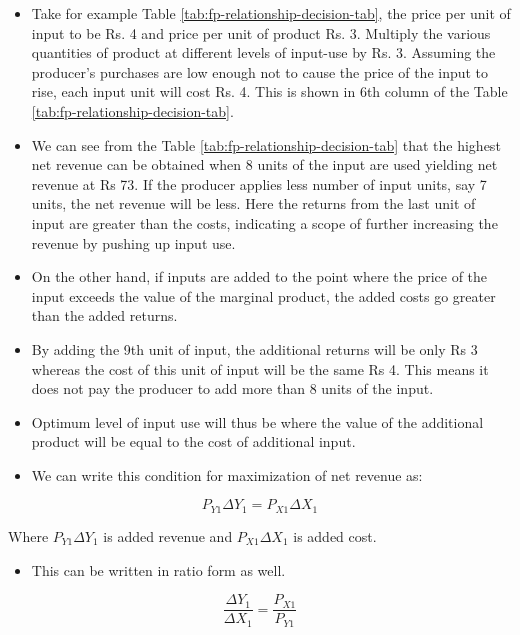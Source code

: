 \documentclass[12pt,ignorenonframetext,aspectratio=169]{beamer}
\providecommand{\tightlist}{%
  \setlength{\itemsep}{0pt}\setlength{\parskip}{0pt}}
\begin{document}
\begin{frame}{}
\protect\hypertarget{section-15}{}
\begin{itemize}
\tightlist
\item
  Take for example Table \ref{tab:fp-relationship-decision-tab}, the
  price per unit of input to be Rs. 4 and price per unit of product Rs.
  3. Multiply the various quantities of product at different levels of
  input-use by Rs. 3. Assuming the producer's purchases are low enough
  not to cause the price of the input to rise, each input unit will cost
  Rs. 4. This is shown in 6th column of the Table
  \ref{tab:fp-relationship-decision-tab}.
\item
  We can see from the Table \ref{tab:fp-relationship-decision-tab} that
  the highest net revenue can be obtained when 8 units of the input are
  used yielding net revenue at Rs 73. If the producer applies less
  number of input units, say 7 units, the net revenue will be less. Here
  the returns from the last unit of input are greater than the costs,
  indicating a scope of further increasing the revenue by pushing up
  input use.
\end{itemize}
\end{frame}

\begin{frame}{}
\protect\hypertarget{section-16}{}
\begin{itemize}
\tightlist
\item
  On the other hand, if inputs are added to the point where the price of
  the input exceeds the value of the marginal product, the added costs
  go greater than the added returns.
\item
  By adding the 9th unit of input, the additional returns will be only
  Rs 3 whereas the cost of this unit of input will be the same Rs 4.
  This means it does not pay the producer to add more than 8 units of
  the input.
\item
  Optimum level of input use will thus be where the value of the
  additional product will be equal to the cost of additional input.
\end{itemize}
\end{frame}

\begin{frame}{}
\protect\hypertarget{section-17}{}
\begin{itemize}
\tightlist
\item
  We can write this condition for maximization of net revenue as:
\end{itemize}

\[
P_{Y1} \Delta Y_1 = P_{X1} \Delta X_1
\]

Where \(P_{Y1} \Delta Y_1\) is added revenue and \(P_{X1} \Delta X_1\)
is added cost.

\begin{itemize}
\tightlist
\item
  This can be written in ratio form as well.
\end{itemize}

\[
\frac{\Delta Y_1}{\Delta X_1} = \frac{P_{X1}}{P_{Y1}}
\]
\end{frame}
\end{document}
